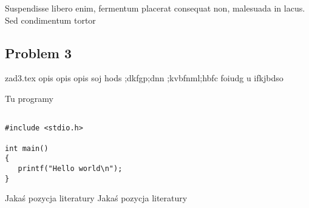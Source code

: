\documentclass[twoside]{pracaInzynierskaMS}
\begin{document}
 Suspendisse libero enim, fermentum placerat consequat non, malesuada in lacus. Sed condimentum tortor
\newpage
\subsection {Problem 3}
 {zad3.tex}
opis opis opis 
soj hods
;dkfgp;dnn
;kvbfnml;hbfc
foiudg u
ifkjbdso




Tu programy

\begin{verbatim}

#include <stdio.h>

int main()
{
   printf("Hello world\n");
}
\end{verbatim}       
       
       
       
\begin{thebibliography}{12}

 Jakaś pozycja literatury
 Jakaś pozycja literatury

\end{thebibliography}
\end{document}
